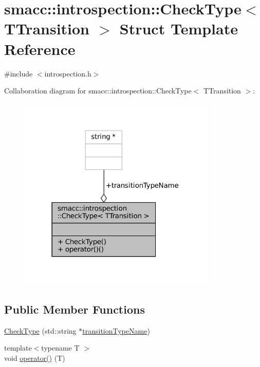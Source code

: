 \hypertarget{structsmacc_1_1introspection_1_1CheckType}{}\section{smacc\+:\+:introspection\+:\+:Check\+Type$<$ T\+Transition $>$ Struct Template Reference}
\label{structsmacc_1_1introspection_1_1CheckType}


{\ttfamily \#include $<$introspection.\+h$>$}



Collaboration diagram for smacc\+:\+:introspection\+:\+:Check\+Type$<$ T\+Transition $>$\+:
\nopagebreak
\begin{figure}[H]
\begin{center}
\leavevmode
\includegraphics[width=266pt]{structsmacc_1_1introspection_1_1CheckType__coll__graph}
\end{center}
\end{figure}
\subsection*{Public Member Functions}
\begin{DoxyCompactItemize}
\item 
\hyperlink{structsmacc_1_1introspection_1_1CheckType_a5f35a9f0375faf0e8e15088206d3692c}{Check\+Type} (std\+::string $\ast$\hyperlink{structsmacc_1_1introspection_1_1CheckType_a0b356fd5975fa8f359f4e47f9ac8debf}{transition\+Type\+Name})
\item 
{\footnotesize template$<$typename T $>$ }\\void \hyperlink{structsmacc_1_1introspection_1_1CheckType_abdf8cd065f31c69615c91af287192b9a}{operator()} (T)
\end{DoxyCompactItemize}
